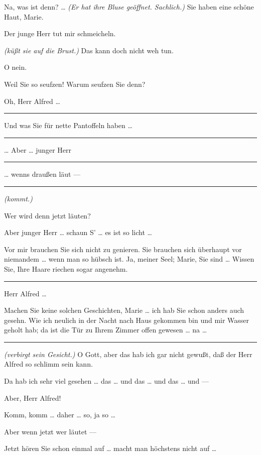 \documentclass[
	final,
	a4paper,
	ngerman,
	mpinclude = true, %
	twoside = true,
	open = right,
	cleardoublepage = plain,
	DIV = 13,
	BCOR = 1cm,
	titlepage = firstiscover,
	]{scrbook}
\newcommand{\direction}[1]{\textit{(#1)}}
\newenvironment{deletion}{%
		\vspace{0.25\baselineskip}
		\hrule
		\vspace{0.25\baselineskip}
		\color{darkgray}
	}{
		\color{black}
		\vspace{0.25\baselineskip}
		\hrule 
		\vspace{0.25\baselineskip}
	}
\newcommand{\thecharacter}[1]{\textup{\textsc{#1}}\xspace}
\newcommand{\thepraktikant}{\thecharacter{Praktikant}}
\newcommand{\theherr}{\thecharacter{Junger Herr}}
\newcommand{\character}[1]{\item[#1:]}
\newcommand{\praktikant}{\character{\thepraktikant}}
\newcommand{\herr}{\character{\theherr}}
\begin{document}
\begin{play}
	\herr
	Na, was ist denn? \ldots{} \direction{Er hat ihre Bluse geöffnet. Sachlich.} Sie haben eine schöne Haut, Marie.

	\praktikant
	Der junge Herr tut mir schmeicheln.

	\herr
	\direction{küßt sie auf die Brust.} Das kann doch nicht weh tun.

	\praktikant
	O nein.

	\herr
	Weil Sie so seufzen! Warum seufzen Sie denn?

	\praktikant
	Oh, Herr Alfred \ldots{}

	\begin{deletion}
	\herr
	Und was Sie für nette Pantoffeln haben \ldots{}
	\end{deletion}

	\praktikant
	\ldots{} Aber \ldots{} junger Herr 
	\begin{deletion}
		\ldots{} wenns draußen läut ---
	\end{deletion}
	\direction{kommt.}

	\herr
	Wer wird denn jetzt läuten?

	\praktikant
	Aber junger Herr \ldots{} schaun S' \ldots{} es ist so licht \ldots{}

	\herr
	Vor mir brauchen Sie sich nicht zu genieren. Sie brauchen sich überhaupt vor niemandem \ldots{} wenn man so hübsch ist. Ja, meiner Seel; Marie, Sie sind \ldots{} Wissen Sie, Ihre Haare riechen sogar angenehm.

	\begin{deletion}
	\praktikant
	Herr Alfred \ldots{}

	\herr
	Machen Sie keine solchen Geschichten, Marie \ldots{} ich hab Sie schon anders auch gesehn. Wie ich neulich in der Nacht nach Haus gekommen bin und mir Wasser geholt hab; da ist die Tür zu Ihrem Zimmer offen gewesen \ldots{} na \ldots{}
	\end{deletion}

	\praktikant
	\direction{verbirgt sein Gesicht.} O Gott, aber das hab ich gar nicht gewußt, daß der Herr Alfred so schlimm sein kann.

	\herr
	Da hab ich sehr viel gesehen \ldots{} das \ldots{} und das \ldots{} und das \ldots{} und ---

	\praktikant
	Aber, Herr Alfred!

	\herr
	Komm, komm \ldots{} daher \ldots{} so, ja so \ldots{}

	\praktikant
	Aber wenn jetzt wer läutet ---

	\herr
	Jetzt hören Sie schon einmal auf \ldots{} macht man höchstens nicht auf \ldots{}


\end{play}
\end{document}
